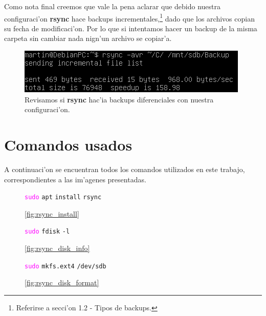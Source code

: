 \documentclass[11pt]{article}
\newcommand{\imagecaption}[1]{\vspace{-7pt}\caption*{\char91\ref{fig:#1}\char93}}
\newcommand{\codetext}[2]{\large\texttt{\textcolor{#1}{#2}}}
\newcommand{\rsync}[0]{\textbf{rsync}}
\begin{document}
		Como nota final creemos que vale la pena aclarar que debido nuestra configuraci'on \rsync{} hace backups incrementales,\footnote{Referirse a secci'on 1.2 - Tipos de backups.} dado que los archivos copian su fecha de modificaci'on. Por lo que si intentamos hacer un backup de la misma carpeta sin cambiar nada nign'un archivo se copiar'a.

		\begin{figure}[H]
			\centering
			\includegraphics[scale=0.7]{Images/rsync/rsync_backup_incremental.PNG}
			\caption{Revisamos si \rsync{} hac'ia backups diferenciales con nuestra configuraci'on.}
			\label{fig:rsync_backup_incremental}
		\end{figure}


	\newpage
	\section{Comandos usados}
		A continuaci'on se encuentran todos los comandos utilizados en este trabajo, correspondientes a las im'agenes presentadas.

		\begin{figure}[H]
			\centering
			\begin{code-box}
				\codetext{fuchsia}{sudo} \codetext{light-blue}{apt} \codetext{light-orange}{install} \codetext{light-red}{rsync}
			\end{code-box}
			\imagecaption{rsync_install}
		\end{figure}

		\begin{figure}[H]
			\centering
			\begin{code-box}
				\codetext{fuchsia}{sudo} \codetext{light-blue}{fdisk} \codetext{light-orange}{-l}
			\end{code-box}
			\imagecaption{rsync_disk_info}
		\end{figure}

		\begin{figure}[H]
			\centering
			\begin{code-box}
				\codetext{fuchsia}{sudo} \codetext{light-blue}{mkfs.ext4} \codetext{light-red}{/dev/sdb}
			\end{code-box}
			\imagecaption{rsync_disk_format}
		\end{figure}
\end{document}
